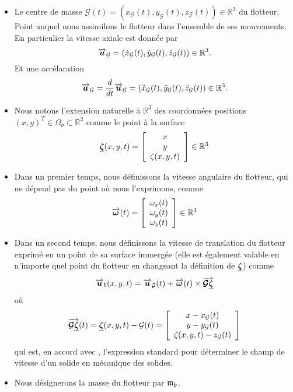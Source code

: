 \begin{itemize}[label=$\mybullet$]
	\item Le centre de masse $\mathcal{G} (t) = \left(x_\mathcal{G} (t), y_\mathcal{G} (t), z_\mathcal{G} (t) \right)\in\mathbb{R}^3$ du flotteur. Point auquel nous assimilons le flotteur dans l'ensemble de ses mouvements. En particulier la vitesse axiale est donnée par
	\begin{equation}
		\overrightarrow{\boldsymbol{u}}_\mathcal{G} = \left(\dot{x}_\mathcal{G}(t), \dot{y}_\mathcal{G}(t), \dot{z}_\mathcal{G}(t)\right)\in\mathbb{R}^3.
	\end{equation}
	Et une accélaration
	\begin{equation}
		\overrightarrow{\boldsymbol{a}}_\mathcal{G} = \frac{d}{dt}\overrightarrow{\boldsymbol{u}}_\mathcal{G} = \left(\ddot{x}_\mathcal{G}(t), \ddot{y}_\mathcal{G}(t), \ddot{z}_\mathcal{G}(t)\right)\in\mathbb{R}^3.
	\end{equation}
	\item Nous notons l'extension naturelle à $\mathbb{R}^3$ des coordonnées positions $\left(x, y\right)^{T}\in \Omega_b\subset \mathbb{R}^2$ comme le point à la surface 
	\begin{equation}
		\underline{\boldsymbol{\zeta}}(x, y, t) = \left[\begin{array}{c} x\\ y\\ \zeta (x, y, t) \end{array}\right] \in \mathbb{R}^3
	\end{equation}
	\item Dans un premier temps, nous définissons la vitesse angulaire du flotteur, qui ne dépend pas du point où nous l'exprimons, comme
	\begin{equation}
		\overrightarrow{\boldsymbol{\omega}}(t) = \left[\begin{array}{c} \omega_x(t)\\ \omega_y(t)\\ \omega_z(t) \end{array}\right]\in\mathbb{R}^3
	\end{equation}
	\item Dans un second temps, nous définissons la vitesse de translation du flotteur exprimé en un point de sa surface immergée (elle est également valable en n'importe quel point du flotteur en changeant la définition de $\boldsymbol{\underline{\zeta}}$) comme
	\begin{equation}
		\overrightarrow{\boldsymbol{u}}_b(x, y, t) = \overrightarrow{\boldsymbol{u}}_\mathcal{G}(t) + \overrightarrow{\boldsymbol{\omega}}(t) \times \overrightarrow{\boldsymbol{\mathcal{G}\underline{\boldsymbol{\zeta}}}}
	\end{equation}
	où 
	\begin{equation}
		\overrightarrow{\boldsymbol{\mathcal{G}\underline{\boldsymbol{\zeta}}}}(t) = \underline{\boldsymbol{\zeta}}(x, y, t) - \mathcal{G}(t) = \left[\begin{array}{c} x - x_\mathcal{G}(t)\\ y - y_\mathcal{G}(t)\\ \zeta (x, y, t) - z_\mathcal{G}(t) \end{array}\right]
	\end{equation} qui est, en accord avec \citet{lannes_dynamics_2017}, l'expression standard pour déterminer le champ de vitesse d'un solide en mécanique des solides.
	\item Nous désignerons la masse du flotteur par $\mathfrak{m}_{\mathfrak{b}}$.
\end{itemize}

